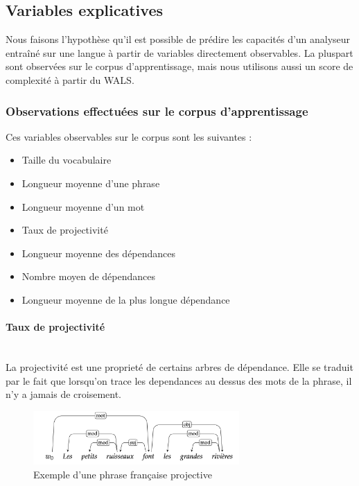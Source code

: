 \documentclass[a4paper, twoside, 12pt]{article}
\newcommand{\myparagraph}[1]{\paragraph{#1}\mbox{}\\}
\begin{document}
    \FloatBarrier

    \subsection{Variables explicatives}

    Nous faisons l'hypothèse qu'il est possible de prédire les capacités d'un analyseur entraîné sur une langue à partir de variables directement observables. La pluspart sont observées sur le corpus d'apprentissage, mais nous utilisons aussi un score de complexité à partir du WALS.

        \subsubsection{Observations effectuées sur le corpus d'apprentissage}
Ces variables observables sur le corpus sont les suivantes :

    \begin{itemize}
        \item Taille du vocabulaire
        \item Longueur moyenne d'une phrase
        \item Longueur moyenne d'un mot
        \item Taux de projectivité
        \item Longueur moyenne des dépendances
        \item Nombre moyen de dépendances
        \item Longueur moyenne de la plus longue dépendance
    \end{itemize}

\myparagraph{Taux de projectivité}

    La projectivité est une proprieté de certains arbres de dépendance. Elle se traduit par le fait que lorsqu’on trace les dependances au dessus des mots de la phrase, il n’y a jamais de croisement.

    \begin{figure}[!h]
        \centering
        \includegraphics[width = 0.7\textwidth]{images/projectivite}
        \caption{Exemple d'une phrase française projective}
        \label{fig:projectiv}
    \end{figure}
\end{document}
